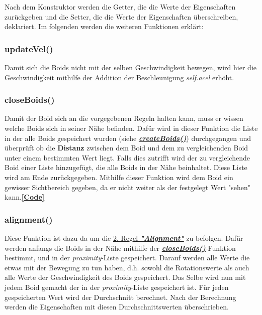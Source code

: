 \documentclass[a4paper, hidelinks, 12pt]{article}
\begin{document}
Nach dem Konstruktor werden die Getter, die die Werte der Eigenschaften zurückgeben und die Setter, die die Werte der Eigenschaften überschreiben, deklariert.
Im folgenden werden die weiteren Funktionen erklärt:\newline
	
\subsubsection{updateVel()}\label{UmsetzungupdateVel}
Damit sich die Boids nicht mit der selben Geschwindigkeit bewegen, wird hier die Geschwindigkeit mithilfe der Addition der Beschleunigung \emph{self.acel} erhöht.
\newline
		
\subsubsection{closeBoids()}\label{UmsetzungcloseBoids}
Damit der Boid sich an die vorgegebenen Regeln halten kann, muss er wissen welche Boids sich in seiner Nähe befinden. Dafür wird in dieser Funktion die Liste in der alle Boids gespeichert wurden (siehe \hyperref[UmsetzungcreateBoids]{\emph{\textbf{createBoids()}}}) durchgegangen und überprüft ob die \textbf{Distanz}\cite{distance} zwischen dem Boid und dem zu vergleichenden Boid unter einem bestimmten Wert liegt. Falls dies zutrifft wird der zu vergleichende Boid einer Liste hinzugefügt, die alle Boids in der Nähe beinhaltet. Diese Liste wird am Ende zurückgegeben. Mithilfe dieser Funktion wird dem Boid ein gewisser Sichtbereich gegeben, da er nicht weiter als der festgelegt Wert "sehen" kann.\hyperref[CodecloseBoids]{\textbf{[Code]}}
\newline
		
\subsubsection{alignment()}\label{Umsetzungalignment}
Diese Funktion ist dazu da um die \hyperref[IdeeAlignment]{2. Regel \textbf{\emph{"Alignment"}}} zu befolgen. Dafür werden anfangs die Boids in der Nähe mithilfe der \hyperref[UmsetzungcloseBoids]{\emph{\textbf{closeBoids()}}}-Funktion bestimmt, und in der \emph{proximity}-Liste gespeichert. Darauf werden alle Werte die etwas mit der Bewegung zu tun haben, d.h. sowohl die Rotationswerte als auch alle Werte der Geschwindigkeit des Boids gespeichert. Das Selbe wird nun mit jedem Boid gemacht der in der \emph{proximity}-Liste gespeichert ist. Für jeden gespeicherten Wert wird der Durchschnitt berechnet. Nach der Berechnung werden die Eigenschaften mit diesen Durchschnittswerten überschrieben.
\newline\newline
\end{document}
